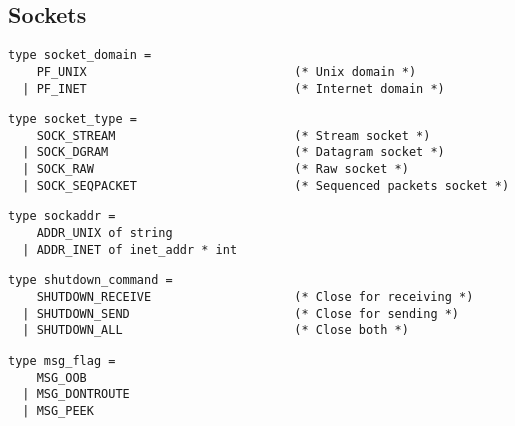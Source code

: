 \subsection*{Sockets }\begin{verbatim}
type socket_domain =
    PF_UNIX                             (* Unix domain *)
  | PF_INET                             (* Internet domain *)
\end{verbatim}
\begin{comment}
 The type of socket domains. 
\end{comment}
\begin{verbatim}
type socket_type =
    SOCK_STREAM                         (* Stream socket *)
  | SOCK_DGRAM                          (* Datagram socket *)
  | SOCK_RAW                            (* Raw socket *)
  | SOCK_SEQPACKET                      (* Sequenced packets socket *)
\end{verbatim}
\begin{comment}
 The type of socket kinds, specifying the semantics of
           communications. 
\end{comment}
\begin{verbatim}
type sockaddr =
    ADDR_UNIX of string
  | ADDR_INET of inet_addr * int
\end{verbatim}
\begin{comment}
 The type of socket addresses. \verbADDR_UNIX name is a socket
           address in the Unix domain; \verbname is a file name in the file
           system. \verbADDR_INET(addr,port) is a socket address in the Internet
           domain; \verbaddr is the Internet address of the machine, and
           \verbport is the port number. 
\end{comment}
\begin{verbatim}
type shutdown_command =
    SHUTDOWN_RECEIVE                    (* Close for receiving *)
  | SHUTDOWN_SEND                       (* Close for sending *)
  | SHUTDOWN_ALL                        (* Close both *)
\end{verbatim}
\begin{comment}
 The type of commands for \verbshutdown. 
\end{comment}
\begin{verbatim}
type msg_flag =
    MSG_OOB
  | MSG_DONTROUTE
  | MSG_PEEK
\end{verbatim}
\begin{comment}
 The flags for \verbrecv, \verbrecvfrom, \verbsend and \verbsendto. 
\end{comment}
